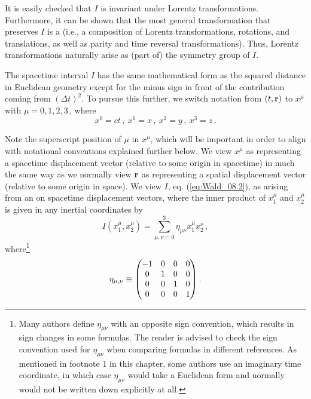 It is easily checked that $I$ is invariant under Lorentz transformations. Furthermore, it can be shown that the most general transformation that preserves $I$ is a  (i.e., a composition of Lorentz transformations, rotations, and translations, as well as parity and time reversal transformations). Thus, Lorentz transformations naturally arise as (part of) the symmetry group of $I$.

The spacetime interval $I$ has the same mathematical form as the squared distance in Euclidean geometry except for the minus sign in front of the contribution coming from  $(\Delta t)^2$. To pursue this further, we switch notation from $(t, \vb{r})$ to $x^\mu$ with $\mu=0,1,2,3\,$, where 
\begin{equation}\label{eq:Wald_08.5}
x^0 = ct\,,\:x^1 = x\,,\:x^2 = y\,,\:x^3 = z\,.
\end{equation}

Note the superscript position of $\mu$ in $x^\mu$, which will be important in order to align with notational conventions explained further below. We view $x^\mu$ as representing a spacetime displacement vector (relative to some origin in spacetime) in much the same way as we normally view $\vb{r}$ as representing a spatial displacement vector (relative to some origin in space). We view $I$, eq. (\ref{eq:Wald_08.2}), as arising from an  on spacetime displacement vectors, where the inner product of $x_1^\mu$ and $x_2^\mu$ is given in any inertial coordinates by 
\begin{equation}\label{eq:Wald_08.6}
I(x_1^\mu, x_2^\mu) = \sum_{\mu, \nu=0}^3 \eta_{\mu\nu} x_1^\mu x_2^\nu\,,
\end{equation}
where\footnote{Many authors  define $\eta_{\mu\nu}$ with an opposite sign convention, which results in sign changes in some formulas. The reader is advised to check the sign convention used for $\eta_{\mu\nu}$ when comparing formulas in different references. As mentioned in footnote 1 in this chapter, some authors use an imaginary time coordinate, in which case $\eta_{\mu\nu}$ would take a Euclidean form and normally would not be written down explicitly at all.}
\begin{equation}\label{eq:Wald_08.7}
\eta_{\mu,\nu} \equiv \mqty( -1 & 0 & 0 & 0 \\ 
                              0 & 1 & 0 & 0 \\
                              0 & 0 & 1 & 0 \\
                              0 & 0 & 0 & 1 )\:.
\end{equation}

